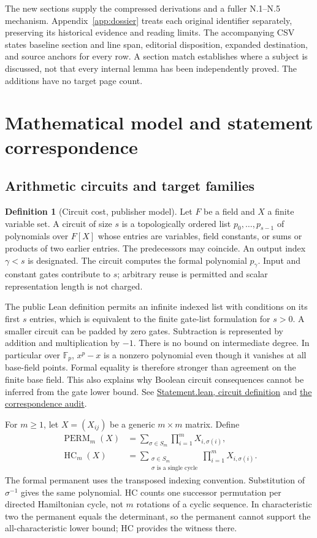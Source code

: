 \documentclass[11pt,letterpaper]{article}
\theoremstyle{definition}\newtheorem{definition}[theorem]{Definition}\newtheorem{example}[theorem]{Example}
\theoremstyle{remark}\newtheorem{remark}[theorem]{Remark}
\newcommand{\HC}{\operatorname{HC}}
\newcommand{\Perm}{\operatorname{PERM}}
\newcommand{\F}{\mathbb{F}}
\newcommand{\pub}[3]{\href{https://github.com/anthropics/formal-math/blob/11b6c7e3c927df2658f513b6b68ea7f8929c62c5/vp-vnp/#1\#L#2}{#3}}
\newcommand{\aud}[2]{\href{https://github.com/nousentllc/VP-VNP-Review/blob/567303d0bcf4f9d54390437b137752446e58ccd6/#1}{#2}}
\begin{document}
The new sections supply the compressed derivations and a fuller N.1--N.5 mechanism. Appendix~\ref{app:dossier} treats each original identifier separately, preserving its historical evidence and reading limits. The accompanying CSV states baseline section and line span, editorial disposition, expanded destination, and source anchors for every row. A section match establishes where a subject is discussed, not that every internal lemma has been independently proved. The additions have no target page count.

\section{Mathematical model and statement correspondence}\label{sec:model}
\subsection{Arithmetic circuits and target families}
\begin{definition}[Circuit cost, publisher model]
Let $F$ be a field and $X$ a finite variable set. A circuit of size $s$ is a topologically ordered list $p_0,\ldots,p_{s-1}$ of polynomials over $F[X]$ whose entries are variables, field constants, or sums or products of two earlier entries. The predecessors may coincide. An output index $\gamma<s$ is designated. The circuit computes the formal polynomial $p_\gamma$. Input and constant gates contribute to $s$; arbitrary reuse is permitted and scalar representation length is not charged.
\end{definition}
The public Lean definition permits an infinite indexed list with conditions on its first $s$ entries, which is equivalent to the finite gate-list formulation for $s>0$. A smaller circuit can be padded by zero gates. Subtraction is represented by addition and multiplication by $-1$. There is no bound on intermediate degree. In particular over $\F_p$, $x^p-x$ is a nonzero polynomial even though it vanishes at all base-field points. Formal equality is therefore stronger than agreement on the finite base field. This also explains why Boolean circuit consequences cannot be inferred from the gate lower bound. See \pub{Statement.lean}{23}{Statement.lean, circuit definition} and \aud{passes/statement-correspondence.md}{the correspondence audit}.

For $m\ge1$, let $X=(X_{ij})$ be a generic $m\times m$ matrix. Define
\begin{align}
\Perm_m(X)&=\sum_{\sigma\in S_m}\prod_{i=1}^m X_{i,\sigma(i)},\\
\HC_m(X)&=\sum_{\substack{\sigma\in S_m\\\sigma\text{ is a single cycle}}}\prod_{i=1}^m X_{i,\sigma(i)}.
\end{align}
The formal permanent uses the transposed indexing convention. Substitution of $\sigma^{-1}$ gives the same polynomial. HC counts one successor permutation per directed Hamiltonian cycle, not $m$ rotations of a cyclic sequence. In characteristic two the permanent equals the determinant, so the permanent cannot support the all-characteristic lower bound; HC provides the witness there.
\end{document}
